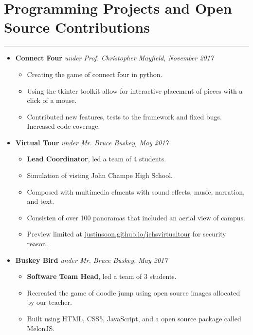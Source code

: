 \documentclass[a4paper]{article}
\begin{document}
\section*{Programming Projects and Open Source Contributions}
\hrule
\vspace{3mm}
\begin{itemize}
	\item
	      \textbf{Connect Four}
	      \hfill \textit{under Prof. Christopher Mayfield, November 2017}
	      \begin{itemize}
	      	\vspace{-2mm} \setlength\itemsep{-0.7mm}
		\item Creating the game of connect four in python.
		\item Using the tkinter toolkit allow for interactive placement of pieces with a click of a mouse.
		\item Contributed new features, tests to the framework and fixed bugs. Increased code coverage.
	      \end{itemize}
	\item
	      \textbf{Virtual Tour}
	      \hfill \textit{under Mr. Bruce Buskey, May 2017}
	      \begin{itemize}
	      	\vspace{-2mm} \setlength\itemsep{-0.7mm}
		\item \textbf{Lead Coordinator}, led a team of 4 students.
		\item Simulation of visting John Champe High School.
		\item Composed with multimedia elments with sound effects, music, narration, and text.
		\item Consisten of over 100 panoramas that included an aerial view of campus.
		\item Preview limited at \href{https://justinsoon.github.io/jchsvirtualtour/}{justinsoon.github.io/jchsvirtualtour} for security reason. 
	      \end{itemize}
	\item
	      \textbf{Buskey Bird}
	      \hfill \textit{under Mr. Bruce Buskey, May 2017}
	      \begin{itemize}
	      	\vspace{-2mm} \setlength\itemsep{-0.7mm}
		\item \textbf{Software Team Head}, led a team of 3 students.
		\item Recreated the game of doodle jump using open source images allocated by our teacher.
		\item Built using HTML, CSS5, JavaScript, and a open source package called MelonJS.

\end{itemize}
\end{itemize}
\end{document}
